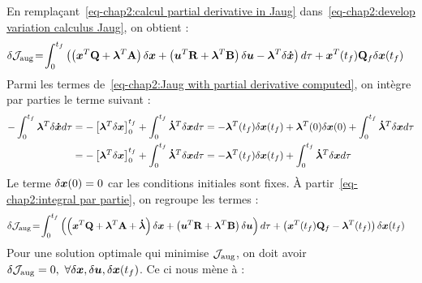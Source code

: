 En remplaçant~\eqref{eq-chap2:calcul partial derivative in Jaug} dans~\eqref{eq-chap2:develop variation calculus Jaug}, on obtient :
 \begin{align}\label{eq-chap2:Jaug with partial derivative computed}
 	\begin{split}
 		\delta{\cal J}_{\rm aug} 
 		&\!=\! \int_0^{t_f}\left(\left(\bm{x}^T\mathbf{Q} + \boldsymbol{\lambda}^T\mathbf{A}\right)\delta\bm{x} + \left(\bm{u}^T\mathbf{R} + \boldsymbol{\lambda}^T\mathbf{B}\right)\delta\bm{u} - \boldsymbol{\lambda}^T\delta\bm{\dot{x}}\right)d\tau  +
 		\bm{x}^T(t_f)\mathbf{Q}_f\delta\bm{x}(t_f)
 	\end{split}
 \end{align}
 Parmi les termes de~\eqref{eq-chap2:Jaug with partial derivative computed}, on intègre par parties le terme suivant :  
 \begin{align}\label{eq-chap2:integral par partie}
 	\begin{split}
 		-\int_0^{t_f} \boldsymbol{\lambda}^T\delta\bm{\dot{x}} d\tau &= -\left[\boldsymbol{\lambda}^T\delta\bm{x}\right]^{t_f}_0 + \int_0^{t_f} \boldsymbol{\dot{\lambda}}^T\delta\bm{x} d\tau = -\boldsymbol{\lambda}^T(t_f)\delta\bm{x}(t_f) + \boldsymbol{\lambda}^T(0)\delta\bm{x}(0) + \int_0^{t_f} \boldsymbol{\dot{\lambda}}^T\delta\bm{x} d\tau \\ 
 		&= -\left[\boldsymbol{\lambda}^T\delta\bm{x}\right]^{t_f}_0 + \int_0^{t_f} \boldsymbol{\dot{\lambda}}^T\delta\bm{x} d\tau = -\boldsymbol{\lambda}^T(t_f)\delta\bm{x}(t_f) + \int_0^{t_f} \boldsymbol{\dot{\lambda}}^T\delta\bm{x} d\tau
 	\end{split}
 \end{align}
 Le terme $\delta\bm{x}(0)=0$ car les conditions initiales sont fixes. À partir~\eqref{eq-chap2:integral par partie}, on regroupe les termes :
 \begin{align}
 	\begin{split}
 		\delta{\cal J}_{\rm aug} 
 		&\!=\! \int_0^{t_f}\left(\left(\bm{x}^T\mathbf{Q} + \boldsymbol{\lambda}^T\mathbf{A}+\boldsymbol{\dot{\lambda}}\right)\delta\bm{x} + \left(\bm{u}^T\mathbf{R} + \boldsymbol{\lambda}^T\mathbf{B}\right)\delta\bm{u} \right)d\tau  + \left(
 		\bm{x}^T(t_f)\mathbf{Q}_f - \boldsymbol{\lambda}^T(t_f)\right)\delta\bm{x}(t_f)
 	\end{split}
 \end{align}
 Pour une solution optimale qui minimise ${\cal J}_{\rm aug}$, on doit avoir $\delta {\cal J}_{\rm aug}=0, \ \forall\delta\state,\delta\command,\delta\state(t_f)$. Ce ci nous mène à :
